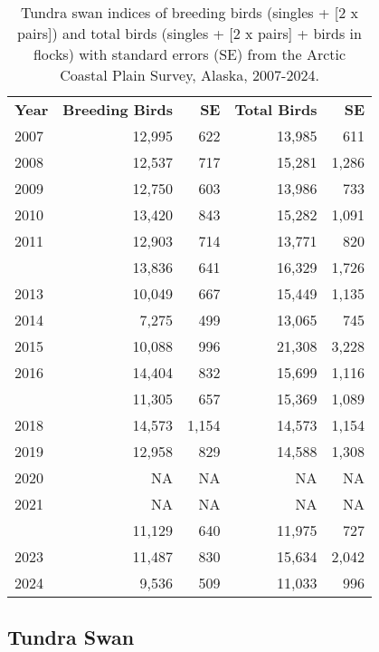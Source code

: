 \documentclass[
]{article}
\begin{document}
\begingroup\fontsize{10}{12}\selectfont

\begin{longtable}[t]{lrrrr}

\caption{\label{tbl-SWAN}Tundra swan indices of breeding birds (singles
+ {[}2 x pairs{]}) and total birds (singles + {[}2 x pairs{]} + birds in
flocks) with standard errors (SE) from the Arctic Coastal Plain Survey,
Alaska, 2007-2024.}

\tabularnewline

\\
\toprule
\textbf{Year} & \textbf{Breeding Birds} & \textbf{SE} & \textbf{Total Birds} & \textbf{SE}\\
\midrule
2007 & 12,995 & 622 & 13,985 & 611\\
2008 & 12,537 & 717 & 15,281 & 1,286\\
2009 & 12,750 & 603 & 13,986 & 733\\
2010 & 13,420 & 843 & 15,282 & 1,091\\
2011 & 12,903 & 714 & 13,771 & 820\\
\addlinespace
2012 & 13,836 & 641 & 16,329 & 1,726\\
2013 & 10,049 & 667 & 15,449 & 1,135\\
2014 & 7,275 & 499 & 13,065 & 745\\
2015 & 10,088 & 996 & 21,308 & 3,228\\
2016 & 14,404 & 832 & 15,699 & 1,116\\
\addlinespace
2017 & 11,305 & 657 & 15,369 & 1,089\\
2018 & 14,573 & 1,154 & 14,573 & 1,154\\
2019 & 12,958 & 829 & 14,588 & 1,308\\
2020 & NA & NA & NA & NA\\
2021 & NA & NA & NA & NA\\
\addlinespace
2022 & 11,129 & 640 & 11,975 & 727\\
2023 & 11,487 & 830 & 15,634 & 2,042\\
2024 & 9,536 & 509 & 11,033 & 996\\
\bottomrule

\end{longtable}

\endgroup{}

\newpage{}

\subsection*{Tundra Swan}\label{tundra-swan-2}
\end{document}
